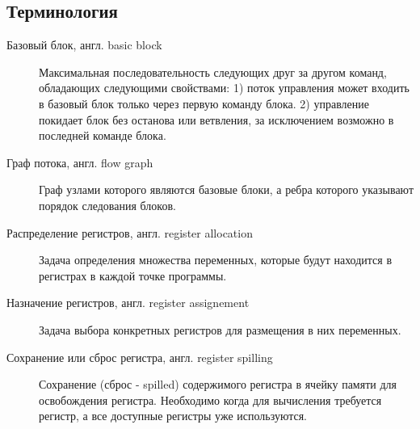\subsection{Терминология}
\begin{description}

\item[Базовый блок, англ. basic block]

Максимальная последовательность следующих друг за другом команд, обладающих следующими свойствами: 1) поток управления может входить в базовый блок только через первую команду блока. 2) управление покидает блок без останова или ветвления, за исключением возможно в последней команде блока.

\item[Граф потока, англ. flow graph]

Граф узлами которого являются базовые блоки, а ребра которого указывают порядок следования блоков.

\item[Распределение регистров, англ. register allocation]

Задача определения множества переменных, которые будут находится в регистрах в каждой точке программы.

\item[Назначение регистров, англ. register assignement]

Задача выбора конкретных регистров для размещения в них переменных.

\item[Сохранение или сброс регистра, англ. register spilling]

Сохранение (сброс - spilled) содержимого регистра в ячейку памяти для освобождения регистра. Необходимо
когда для вычисления требуется регистр, а все доступные регистры уже используются.



\end{description}

